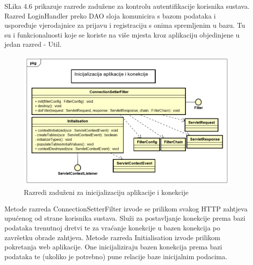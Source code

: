 		SLika 4.6 prikazuje razrede zadužene za kontrolu autentifikacije korisnika sustava. Razred LoginHandler preko DAO sloja komunicira s bazom podataka i uspoređuje vjerodajnice za prijavu i registraciju s onima spremljenim u bazu. Tu su i funkcionalnosti koje se koriste na više mjesta kroz aplikaciju objedinjene u jedan razred - Util.
		
			\begin{figure}[H]
				\includegraphics[scale=0.65]{Slike/Class Diagram4.PNG}
				\centering
				\caption{Razredi zaduženi za inicijalizaciju aplikacije i konekcije}
				\label{fig:dijagram}
			\end{figure}
		
		Metode razreda ConnectionSetterFilter izvode se prilikom svakog HTTP zahtjeva upućenog od strane korisnika sustava. Služi za postavljanje konekcije prema bazi podataka trenutnoj dretvi te za vraćanje konekcije u bazen konekcija po završetku obrade zahtjeva. \newline
		Metode razreda Initialisation izvode prilikom pokretanja web aplikacije. One inicijaliziraju bazen konekcija prema bazi podataka te (ukoliko je potrebno) pune relacije baze inicijalnim podacima.
		
